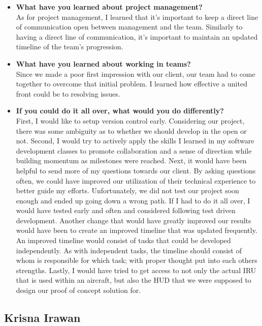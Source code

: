 \begin{itemize}
			\item \textbf{What have you learned about project management?} \\
				As for project management, I learned that it's important to keep a direct line of communication open between management and the team.
				Similarly to having a direct line of communication, it's important to maintain an updated timeline of the team's progression. \\

			\item \textbf{What have you learned about working in teams?} \\
				Since we made a poor first impression with our client, our team had to come together to overcome that initial problem.
				I learned how effective a united front could be to resolving issues. \\

			\item \textbf{If you could do it all over, what would you do differently?} \\
				First, I would like to setup version control early.
				Considering our project, there was some ambiguity as to whether we should develop in the open or not.
				Second, I would try to actively apply the skills I learned in my software development classes to promote collaboration and a sense of direction while building momentum as milestones were reached.
				Next, it would have been helpful to send more of my questions towards our client.
				By asking questions often, we could have improved our utilization of their technical experience to better guide my efforts.
				Unfortunately, we did not test our project soon enough and ended up going down a wrong path.
				If I had to do it all over, I would have tested early and often and considered following test driven development.
				Another change that would have greatly improved our results would have been to create an improved timeline that was updated frequently.
				An improved timeline would consist of tasks that could be developed independently.
				As with independent tasks, the timeline should consist of whom is responsible for which task; with proper thought put into each others strengths.
				Lastly, I would have tried to get access to not only the actual IRU that is used within an aircraft, but also the HUD that we were supposed to design our proof of concept solution for. \\
		\end{itemize}

	\subsection{Krisna Irawan}



